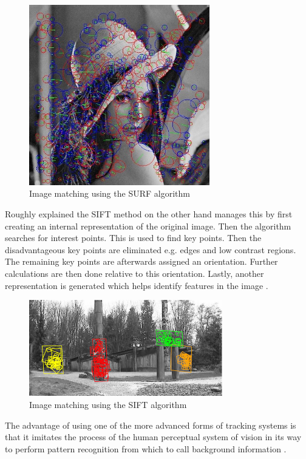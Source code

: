 \begin{figure}[h!]
    \centering
    \includegraphics[width=0.7\textwidth]{figures/SURF.jpg}
    \caption{Image matching using the SURF algorithm}\label{fig:SURF}
\end{figure}

Roughly explained the SIFT method on the other hand manages this by first creating an internal representation of the original image. Then the algorithm searches for interest points. This is used to find key points. Then the disadvantageous key points are eliminated e.g. edges and low contrast regions. The remaining key points are afterwards assigned an orientation. Further calculations are then done relative to this orientation. Lastly, another representation is generated which helps identify features in the image \cite{Sinha}.


\begin{figure}[h!]
    \centering
    \includegraphics[width=0.75\textwidth]{figures/SIFT.jpg}
    \caption{Image matching using the SIFT algorithm}\label{fig:SIFT}
\end{figure}

The advantage of using one of the more advanced forms of tracking systems is that it imitates the process of the human perceptual system of vision in its way to perform pattern recognition from which to call background information \cite{Woodford}.

